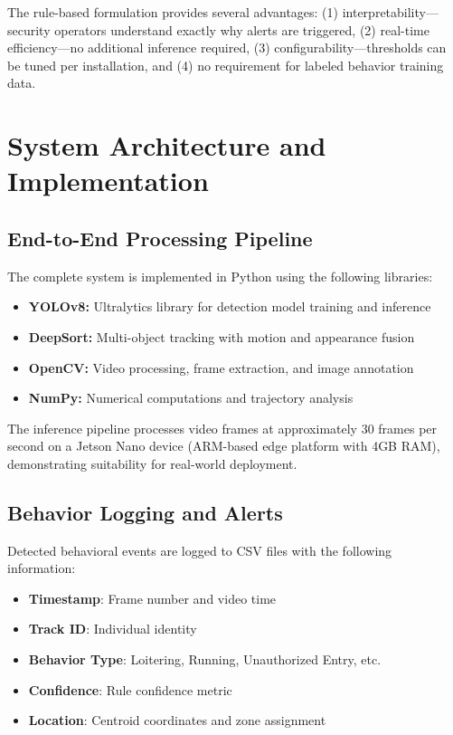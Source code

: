 \documentclass[conference]{IEEEtran}
\begin{document}
The rule-based formulation provides several advantages: (1) interpretability—security operators understand exactly why alerts are triggered, (2) real-time efficiency—no additional inference required, (3) configurability—thresholds can be tuned per installation, and (4) no requirement for labeled behavior training data.

\section{System Architecture and Implementation}

\subsection{End-to-End Processing Pipeline}

The complete system is implemented in Python using the following libraries:
\begin{itemize}
\item \textbf{YOLOv8:} Ultralytics library for detection model training and inference
\item \textbf{DeepSort:} Multi-object tracking with motion and appearance fusion
\item \textbf{OpenCV:} Video processing, frame extraction, and image annotation
\item \textbf{NumPy:} Numerical computations and trajectory analysis
\end{itemize}

The inference pipeline processes video frames at approximately 30 frames per second on a Jetson Nano device (ARM-based edge platform with 4GB RAM), demonstrating suitability for real-world deployment.

\subsection{Behavior Logging and Alerts}

Detected behavioral events are logged to CSV files with the following information:
\begin{itemize}
\item \textbf{Timestamp}: Frame number and video time
\item \textbf{Track ID}: Individual identity
\item \textbf{Behavior Type}: Loitering, Running, Unauthorized Entry, etc.
\item \textbf{Confidence}: Rule confidence metric
\item \textbf{Location}: Centroid coordinates and zone assignment
\end{itemize}
\end{document}
